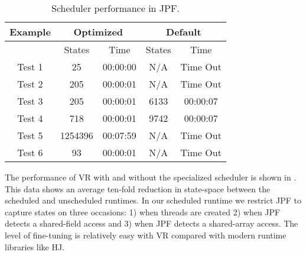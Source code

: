 \begin{table}
\caption{Scheduler performance in JPF.}
\begin{center}
\begin{tabular}{|c||c|c|c|c|}
\hline
Example & \multicolumn{2}{|c|}{Optimized} & \multicolumn{2}{|c|}{Default} \\
\hline
  & States & Time & States & Time \\
\hline
Test 1 & 25 & 00:00:00 & N/A & Time Out \\
Test 2 & 205 & 00:00:01 & N/A & Time Out \\
Test 3 & 205 & 00:00:01 & 6133 & 00:00:07 \\
Test 4 & 718 & 00:00:01 & 9742 & 00:00:07 \\
Test 5 & 1254396 & 00:07:59 & N/A & Time Out \\
Test 6 & 93 & 00:00:01 & N/A & Time Out \\
\hline
\end{tabular}
\end{center}
\label{tab:perf}
\end{table}

The performance of VR with and without the specialized scheduler is shown in . This data shows an average ten-fold reduction in state-space between the scheduled and unscheduled runtimes. In our scheduled runtime we restrict JPF to capture states on three occasions: 1) when threads are created 2) when JPF detects a shared-field access and 3) when JPF detects a shared-array access. The level of fine-tuning is relatively easy with VR compared with modern runtime libraries like HJ.  


